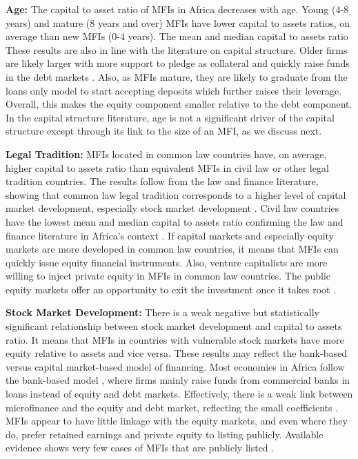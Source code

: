 \documentclass[a4paper,nobind]{templates/ociamthesis}
\begin{document}
\textbf{Age:} The capital to asset ratio of MFIs in Africa decreases with age. Young (4-8 years) and mature (8 years and over) MFIs have lower capital to assets ratios, on average than new MFIs (0-4 years). The mean and median capital to assets ratio These results are also in line with the literature on capital structure. Older firms are likely larger with more support to pledge as collateral and quickly raise funds in the debt markets \autocite{barclay2005capital}. Also, as MFIs mature, they are likely to graduate from the loans only model to start accepting deposits which further raises their leverage. Overall, this makes the equity component smaller relative to the debt component. In the capital structure literature, age is not a significant driver of the capital structure except through its link to the size of an MFI, as we discuss next.

\textbf{Legal Tradition:} MFIs located in common law countries have, on average, higher capital to assets ratio than equivalent MFIs in civil law or other legal tradition countries. The results follow from the law and finance literature, showing that common law legal tradition corresponds to a higher level of capital market development, especially stock market development \autocite{la2013law}. Civil law countries have the lowest mean and median capital to assets ratio confirming the law and finance literature in Africa's context \autocite{schnyder2018twenty}. If capital markets and especially equity markets are more developed in common law countries, it means that MFIs can quickly issue equity financial instruments. Also, venture capitalists are more willing to inject private equity in MFIs in common law countries. The public equity markets offer an opportunity to exit the investment once it takes root \autocite{kent2013bankers}.

\textbf{Stock Market Development:} There is a weak negative but statistically significant relationship between stock market development and capital to assets ratio. It means that MFIs in countries with vulnerable stock markets have more equity relative to assets and vice versa. These results may reflect the bank-based versus capital market-based model of financing. Most economies in Africa follow the bank-based model \autocite{gropp2010determinants}, where firms mainly raise funds from commercial banks in loans instead of equity and debt markets. Effectively, there is a weak link between microfinance and the equity and debt market, reflecting the small coefficients \autocite{ahmed2014financial}. MFIs appear to have little linkage with the equity markets, and even where they do, prefer retained earnings and private equity to listing publicly. Available evidence shows very few cases of MFIs that are publicly listed \autocite{hishigsuren2006transformation}.
\end{document}
